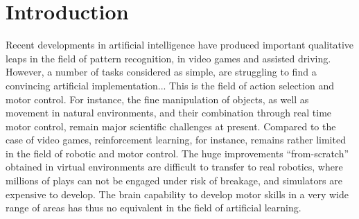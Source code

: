 \documentclass[runningheads]{llncs}
\begin{document}
\section{Introduction}

Recent developments in artificial intelligence have produced important qualitative leaps in the field of pattern recognition, %
in video games and assisted driving.
However, a number of tasks considered as simple, %
are struggling to find a convincing artificial implementation... This is the field of action selection and motor control. For instance, the fine manipulation of objects, as well as movement in natural environments, and their combination through real time motor control, remain major scientific challenges at present.
Compared to the case of video games, reinforcement learning, for instance, remains rather limited in the field of robotic and motor control. The huge  improvements ``from-scratch'' obtained in virtual environments are difficult to transfer to real robotics, where millions of plays can not be engaged under risk of breakage, and simulators are expensive to develop.
The brain capability to develop motor skills in a very wide range of areas  has thus no equivalent in the field of artificial learning.   
\end{document}
